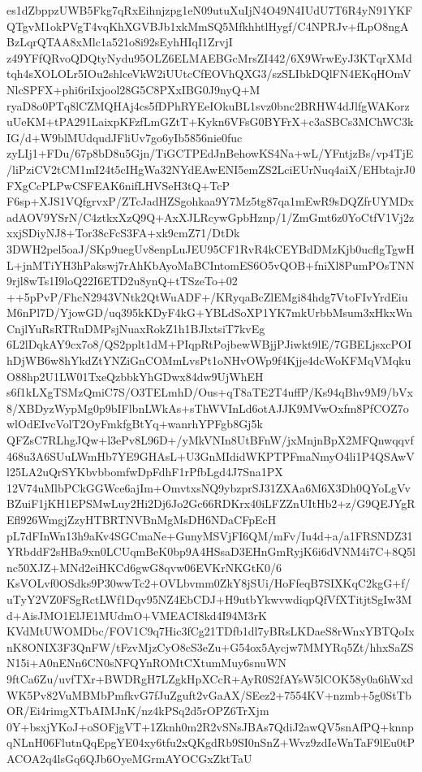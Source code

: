 \documentclass[multi=frame]{standalone}
\begin{document}
\begin{world}
        es1dZbppzUWB5Fkg7qRxEihnjzpg1eN09utuXuIjN4O49N4IUdU7T6R4yN91YKFQTgvM1okPVgT4vqKhXGVBJb1xkMmSQ5MfkhhtlHygf/C4NPRJv+fLpO8ngABzLqrQTAA8xMlc1a521o8i92sEyhHIqI1ZrvjI
        z49YFfQRvoQDQtyNydu95OLZ6ELMAEBGcMrsZI442/6X9WrwEyJ3KTqrXMdtqh4sXOLOLr5IOu2shlceVkW2iUUtcCfEOVhQXG3/szSLIbkDQlFN4EKqHOmVNlcSPFX+phi6riIxjool28G5C8PXxIBG0J9nyQ+M
        ryaD8o0PTq8lCZMQHAj4cs5fDPhRYEeIOkuBL1svz0bnc2BRHW4dJlfgWAKorzuUeKM+tPA291LaixpKFzfLmGZtT+Kykn6VFsG0BYFrX+c3aSBCs3MChWC3kIG/d+W9blMUdqudJFliUv7go6yIb5856nie0fuc
        zyLIj1+FDu/67p8bD8u5Gjn/TiGCTPEdJnBehowKS4Na+wL/YFntjzBs/vp4TjE/liPziCV2tCM1mI24t5cIHgWa32NYdEAwENI5emZS2LciEUrNuq4aiX/EHbtajrJ0FXgCcPLPwCSFEAK6nifLHVSeH3tQ+TcP
        F6sp+XJS1VQfgrvxP/ZTcJadHZSgohkaa9Y7Mz5tg87qa1mEwR9sDQZfrUYMDxadAOV9YSrN/C4ztkxXzQ9Q+AxXJLRcywGpbHznp/1/ZmGmt6z0YoCtfV1Vj2zxxjSDiyNJ8+Tor38cFcS3FA+xk9cmZ71/DtDk
        3DWH2pel5oaJ/SKp9uegUv8enpLuJEU95CF1RvR4kCEYBdDMzKjb0ucflgTgwHL+jnMTiYH3hPakswj7rAhKbAyoMaBCIntomES6O5vQOB+fniXl8PumPOsTNN9rjl8wTs1I9loQ22I6ETD2u8ynQ+tTSzeTo+02
        ++5pPvP/FhcN2943VNtk2QtWuADF+/KRyqaBcZlEMgi84hdg7VtoFIvYrdEiuM6nPl7D/YjowGD/uq395kKDyF4kG+YBLdSoXP1YK7mkUrbbMsum3xHkxWnCnjlYuRsRTRuDMPsjNuaxRokZ1h1BJlxtsiT7kvEg
        6L2lDqkAY9cx7o8/QS2pplt1dM+PIqpRtPojbewWBjjPJiwkt9lE/7GBELjsxcPOIhDjWB6w8hYkdZtYNZiGnCOMmLvsPt1oNHvOWp9f4Kjje4dcWoKFMqVMqkuO88hp2U1LW01TxeQzbbkYhGDwx84dw9UjWhEH
        s6f1kLXgTSMzQmiC7S/O3TELmhD/Ous+qT8aTE2T4uffP/Ks94qBhv9M9/bVx8/XBDyzWypMg0p9bIFlbnLWkAs+sThWVInLd6otAJJK9MVwOxfm8PfCOZ7owlOdEIvcVolT2OyFmkfgBtYq+wanrhYPFgb8Gj5k
        QFZsC7RLhgJQw+l3ePv8L96D+/yMkVNIn8UtBFnW/jxMnjnBpX2MFQnwqqvf468u3A6SUuLWmHb7YE9GHAsL+U3GnMIdidWKPTPFmaNmyO4li1P4QSAwVl25LA2uQrSYKbvbbomfwDpFdhF1rPfbLgd4J7Sna1PX
        12V74uMlbPCkGGWce6ajIm+OmvtxsNQ9ybzprSJ31ZXAa6M6X3Dh0QYoLgVvBZuiF1jKH1EPSMwLuy2Hi2Dj6Jo2Gc66RDKrx40iLFZZnUItHb2+z/G9QEJYgREfl926WmgjZzyHTBRTNVBnMgMsDH6NDaCFpEcH
        pL7dFInWn13h9aKv4SGCmaNe+GunyMSVjFI6QM/mFv/Iu4d+a/a1FRSNDZ31YRbddF2sHBa9xn0LCUqmBeK0bp9A4HSsaD3EHnGmRyjK6i6dVNM4i7C+8Q5lnc50XJZ+MNd2eiHKCd6gwG8qvw06EVKrNKGtK0/6
        KsVOLvf0OSdks9P30wwTc2+OVLbvmm0ZkY8jSUi/HoFfeqB7SIXKqC2kgG+f/uTyY2VZ0FSgRctLWf1Dqv95NZ4EbCDJ+H9utbYkwvwdiqpQfVfXTitjtSgIw3Md+AisJMO1ElJE1MUdmO+VMEACI8kd4I94M3rK
        KVdMtUWOMDbc/FOV1C9q7Hic3fCg21TDfb1dl7yBRsLKDaeS8rWnxYBTQoIxnK8ONIX3F3QnFW/tFzvMjzCyO8cS3eZu+G54ox5Aycjw7MMYRq5Zt/hhxSaZSN15i+A0nENn6CN0sNFQYnROMtCXtumMuy6snuWN
        9ftCa6Zu/uvfTXr+BWDRgH7LZgkHpXCcR+AyR0S2fAYsW5lCOK58y0a6hWxdWK5Pv82VuMBMbPmfkvG7fJuZguft2vGaAX/SEez2+7554KV+nzmb+5g0StTbOR/Ei4rimgXTbAIMJnK/nz4kPSq2d5rOPZ6TrXjm
        0Y+bsxjYKoJ+oSOFjgVT+1Zknh0m2R2vSNsJBAs7QdiJ2awQV5snAfPQ+knnpqNLnH06FlutnQqEpgYE04xy6tfu2xQKgdRb9SI0nSnZ+Wvz9zdIeWnTaF9lEu0tPACOA2q4lsGq6QJb6OyeMGrmAYOCGxZktTaU

\end{world}
\end{document}

